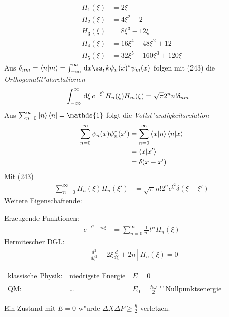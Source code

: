 \documentclass[a4paper]{scrartcl}
\newcommand{\dOne}{\ensuremath \mathds{1}}
\newcommand{\dd}{\ensuremath \, \mathrm{d}}
\begin{document}
{\begin{align}
\begin{split}
H_1(\xi) & = 2 \xi \\
H_2(\xi) & = 4 \xi^2 - 2 \\
H_3(\xi) & = 8 \xi^3 - 12 \xi \\
H_4(\xi) & = 16 \xi^4 - 48 \xi^2 + 12 \\
H_5(\xi) & = 32 \xi^5 - 160 \xi^3 + 120 \xi
\end{split}
\end{align}
Aus $\delta_{nm} = \braket{n | m} = \int_{-\infty}^\infty \dd x ß,k \psi_n(x)^* \psi_m(x)$ folgen mit (243) die \emph{Orthogonalit"atsrelationen}
\begin{align}
\int_{-\infty}^\infty \dd \xi \, e^{-\xi^2} H_n(\xi) H_m(\xi) & =  \sqrt \pi 2^n n! \delta_{nm}
\end{align}
Aus $\sum_{n=0}^\infty \ket n \bra n = \dOne$ folgt die \emph{Vollst"andigkeitsrelation}
\begin{align}
\begin{split}
\sum_{n=0}^\infty \psi_n(x) \psi_n^*(x') & = \sum_{n=0}^\infty \braket{ x | n } \braket{ n | x} \\
& = \braket{ x | x'} \\
& = \delta(x - x')
\end{split}
\end{align}
Mit (243)
\begin{align}
\sum_{n=0}^\infty H_n(\xi) H_n(\xi') & = \sqrt \pi n! 2^n e^{\xi^2} \delta( \xi - \xi')
\end{align}
Weitere Eigenschaftende:

Erzeugende Funktionen:
\begin{align}
e^{-t^2 - it \xi} & = \sum_{n=0}^\infty \frac 1{n!} t^n H_n(\xi)
\end{align}
Hermitescher DGL:
\begin{align}
\left[ \frac{d^2}{d\xi^2} - 2\xi \frac{d}{d\xi} + 2n \right] H_n(\xi) = 0
\end{align}

\begin{center}
\begin{tabular}{ l l l}
klassische Physik: & niedrigste Energie & $E = 0$ \\
QM: & \ldots & $E_0 = \frac{\hbar \omega}2$ "`Nullpunktsenergie
\end{tabular}
\end{center}
Ein Zustand mit $E=0$ w"urde $\Delta X \Delta P \geq \frac \hbar 2$ verletzen.

}
\end{document}
